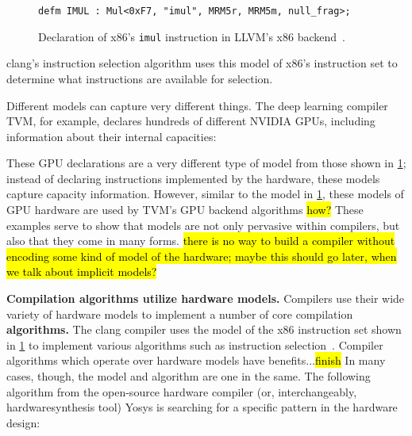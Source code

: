 \begin{figure}[H]
    \centering
\begin{verbatim}
defm IMUL : Mul<0xF7, "imul", MRM5r, MRM5m, null_frag>;
\end{verbatim}
\caption{
Declaration of x86's
  \texttt{imul}
  instruction in LLVM's x86 
  backend~\cite{llvmx86tablegen}.
}
    \label{fig:intro:llvm-tablegen}
\end{figure}

\noindent
clang's instruction selection algorithm
  uses
  this model of
  x86's instruction set
  to determine what instructions
  are available for selection.

Different models
  can capture very different things.
The deep learning compiler TVM,
  for example,
  declares 
  hundreds of different NVIDIA GPUs,
  including information
  about their internal capacities:



\noindent
These GPU declarations
  are a very different type of model
  from those shown in
  \cref{fig:intro:llvm-tablegen};
  instead of declaring instructions
  implemented by the hardware,
  these models capture
  capacity information.
However, similar to the model in 
  \cref{fig:intro:llvm-tablegen},
  these models of GPU hardware
  are used by TVM's GPU backend
  algorithms
  \hl{how?}
These examples serve to show
  that models are not only pervasive
  within compilers,
  but also that
  they come in many forms.
\hl{there is no way to build a compiler
  without encoding some kind 
  of model of the hardware;
  maybe this should go later, when we talk about implicit models?}

\textbf{Compilation algorithms
  utilize hardware models.}
Compilers use their
  wide variety of
  hardware models
  to implement a number of core
  compilation
  \textbf{algorithms.}
The clang compiler uses 
  the model of the x86 instruction set
  shown in \cref{fig:intro:llvm-tablegen}
  to implement
  various algorithms
  such as instruction 
  selection~\cite{llvminstructionselection}.
Compiler algorithms
  which operate over hardware models
  have benefits...\hl{finish}
In many cases, though,
  the model and algorithm are 
  one in the same.
The following algorithm
  from the open-source hardware compiler
  (or, interchangeably,
    \gls{hardwaresynthesis} tool)
  Yosys
  is searching for a specific pattern 
  in the hardware design:

